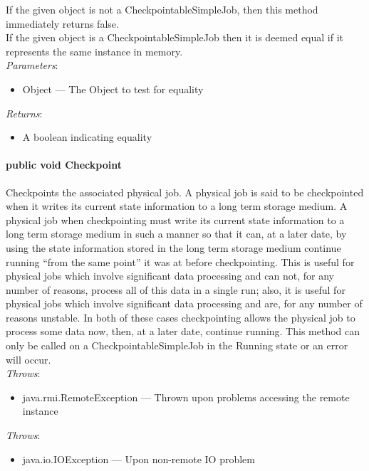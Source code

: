 \documentclass[$Date: 2003/06/26 19:29:31 $]{glabarticle}
\begin{document}
 If the given object is not a CheckpointableSimpleJob, then this
 method immediately returns false. \\
 
 If the given object is a CheckpointableSimpleJob then it is deemed
 equal if it represents the same instance in memory. \\

 \textit{Parameters}:
 \begin{itemize}
 \item[] Object --- The Object to test for equality 
 \end{itemize}
 
 \textit{Returns}:
\begin{itemize}
\item[] A boolean indicating equality
\end{itemize}

\paragraph{public void Checkpoint}

Checkpoints the associated physical job. A physical job is said to be
checkpointed when it writes its current state information to a long
term storage medium. A physical job when checkpointing must write its
current state information to a long term storage medium in such a
manner so that it can, at a later date, by using the state information
stored in the long term storage medium continue running ``from the
same point'' it was at before checkpointing. This is useful for
physical jobs which involve significant data processing and can not,
for any number of reasons, process all of this data in a single run;
also, it is useful for physical jobs which involve significant data
processing and are, for any number of reasons unstable. In both of
these cases checkpointing allows the physical job to process some data
now, then, at a later date, continue running. This method can only be
called on a CheckpointableSimpleJob in the Running state or an error
will occur. \\

 \textit{Throws}:
 \begin{itemize}
 \item[] java.rmi.RemoteException --- Thrown upon problems accessing the remote instance
 \end{itemize}

\textit{Throws}:
\begin{itemize}
\item[] java.io.IOException --- Upon non-remote IO problem 
\end{itemize} 
\end{document}
